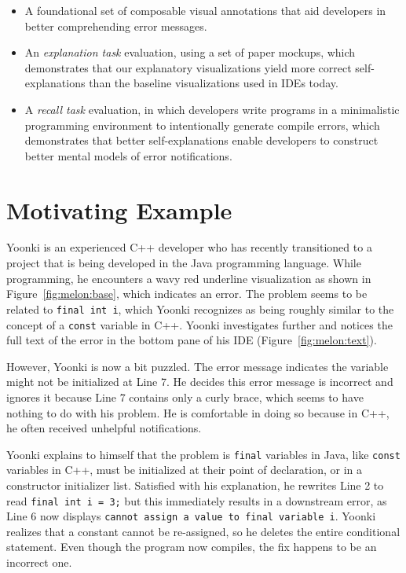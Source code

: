 \documentclass[conference]{IEEEtran}
\begin{document}
\begin{itemize}
\item A foundational set of composable visual annotations that aid developers in better comprehending error messages.
\item An \textit{explanation task} evaluation, using a set of paper mockups, which demonstrates that our explanatory visualizations yield more correct self-explanations than the baseline visualizations used in IDEs today. 
\item A \textit{recall task} evaluation, in which developers write programs in a minimalistic programming environment to intentionally generate compile errors, which demonstrates that better self-explanations enable developers to construct better mental models of error notifications.
\end{itemize}

\section{Motivating Example}

Yoonki is an experienced C++ developer who has recently transitioned to a project that is being developed in the Java programming language. While programming, he encounters a wavy red underline visualization as shown in Figure~\ref{fig:melon:base}, which indicates an error. The problem seems to be related to \texttt{final int i}, which Yoonki recognizes as being roughly similar to the concept of a \texttt{const} variable in C++. Yoonki investigates further and notices the full text of the error in the bottom pane of his IDE (Figure~\ref{fig:melon:text}). 

However, Yoonki is now a bit puzzled. The error message indicates the variable might not be initialized at Line 7. He decides this error message is incorrect and ignores it because Line 7 contains only a curly brace, which seems to have nothing to do with his problem. He is comfortable in doing so because in C++, he often received unhelpful notifications.

Yoonki explains to himself that the problem is \texttt{final} variables in Java, like \texttt{const} variables in C++, must be initialized at their point of declaration, or in a constructor initializer list. Satisfied with his explanation, he rewrites Line 2 to read \texttt{final int i = 3;} but this immediately results in a downstream error, as Line 6 now displays \texttt{cannot assign a value to final variable i}. Yoonki realizes that a constant cannot be re-assigned, so he deletes the entire conditional statement. Even though the program now compiles, the fix happens to be an incorrect one.
\end{document}
